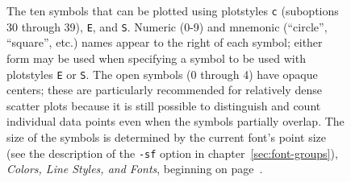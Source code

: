 \documentclass{book}
\begin{document}
\begin{figure}
\begin{center}
\end{center}
\caption[Open and filled plot symbols]{The ten symbols \label{fig:symbols} that
can be plotted using plotstyles {\tt c} (suboptions 30 through 39), {\tt E},
and {\tt S}.  Numeric (0-9) and mnemonic (``circle'', ``square'', etc.) names
appear to the right of each symbol; either form may be used when specifying a
symbol to be used with plotstyles {\tt E} or {\tt S}.  The open symbols (0
through 4) have opaque centers; these are particularly recommended for
relatively dense scatter plots because it is still possible to distinguish and
count individual data points even when the symbols partially overlap.  The size
of the symbols is determined by the current font's point size (see the
description of the {\tt -sf} option in chapter~\ref{sec:font-groups}), {\em
Colors, Line Styles, and Fonts}, beginning on page~\pageref{sec:font-groups}.}
\end{figure}
\end{document}
